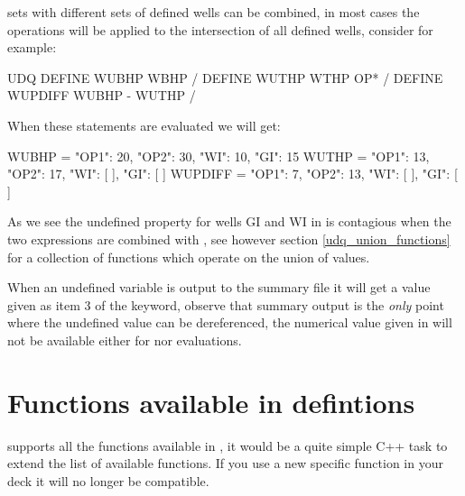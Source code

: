 \udq{} sets with different sets of defined wells can be combined, in most cases
the operations will be applied to the intersection of all defined wells,
consider for example\label{udq_diff}:

\begin{deck}
UDQ
  DEFINE WUBHP    WBHP /
  DEFINE WUTHP    WTHP OP* /
  DEFINE WUPDIFF  WUBHP - WUTHP
/
\end{deck}
When these \udq{} statements are evaluated we will get:
\begin{code}
  WUBHP   = {"OP1": 20, "OP2": 30, "WI": 10,  "GI": 15}
  WUTHP   = {"OP1": 13, "OP2": 17, "WI": [ ], "GI": [ ]}
  WUPDIFF = {"OP1":  7, "OP2": 13, "WI": [ ], "GI": [ ]}
\end{code}
As we see the undefined property for wells GI and WI in  is contagious
when the two expressions are combined with ,
see however section \ref{udq_union_functions} for a collection of functions
which operate on the union of values.

When an undefined variable is output to the summary file it will get a value
given as item 3 of the  keyword, observe that summary output is the
\emph{only} point where the undefined value can be dereferenced, the numerical
value given in  will not be available either for \udq{} nor
 evaluations.


\section{Functions available in \udq{} defintions}
\label{udq_functions}
\flow{} supports all the \udq{} functions available in \eclipse{}, it would be a
quite simple C++ task to extend the list of available functions. If you use a
new \flow{} specific function in your deck it will no longer be \eclipse{}
compatible.

